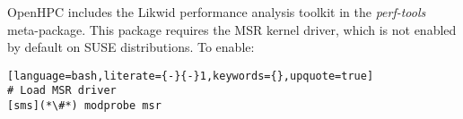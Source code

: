 \begin{center}
\begin{tcolorbox}[]
\small
OpenHPC includes the Likwid performance analysis toolkit in the {\em perf-tools} meta-package. This package
requires the MSR kernel driver, which is not enabled by default on SUSE distributions. To enable:
\begin{lstlisting}[language=bash,literate={-}{-}1,keywords={},upquote=true]
# Load MSR driver
[sms](*\#*) modprobe msr
\end{lstlisting}
\end{tcolorbox}
\end{center}


